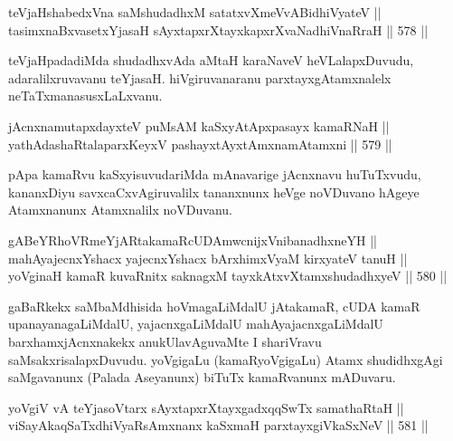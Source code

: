 
\begin{shl}
teVjaHshabedxVna saMshudadhxM satatxvXmeVvABidhiVyateV || \\
tasimxnaBxvasetxYjasaH sAyxtapxrXtayxkapxrXvaNadhiVnaRraH \hfill || 578 ||  
\end{shl}

\begin{artha}
teVjaHpadadiMda shudadhxvAda aMtaH karaNaveV heVLalapxDuvudu,
adaralilxruvavanu teYjasaH. hiVgiruvanaranu parxtayxgAtamxnalelx
neTaTxmanasusxLaLxvanu.
\end{artha}


\begin{shl}
jAcnxnamutapxdayxteV puMsAM kaSxyAtApxpasayx kamaRNaH || \\
yathA\s \s dashaRtalaparxKeyxV pashayxtAyxtAmxnamAtamxni \hfill || 579 ||  
\end{shl}

\begin{artha}
pApa kamaRvu kaSxyisuvudariMda mAnavarige jAcnxnavu huTuTxvudu,
kananxDiyu savxcaCxvAgiruvalilx tananxnunx heVge noVDuvano hAgeye
Atamxnanunx Atamxnalilx noVDuvanu.
\end{artha}


\begin{shl}
gABeYRhoVRmeYjARtakamaRcUDAmwcnijxVnibanadhxneYH || \\
mahAyajecnxYshacx yajecnxYshacx bArxhimxVyaM kirxyateV tanuH || \\
yoVginaH kamaR kuvaRnitx saknagxM tayxkAtxvX\s \s tamxshudadhxyeV \hfill || 580 ||  
\end{shl}

\begin{artha}
gaBaRkekx saMbaMdhisida hoVmagaLiMdalU jAtakamaR, cUDA kamaR
upanayanagaLiMdalU, yajacnxgaLiMdalU mahAyajacnx\-\break gaLiMdalU
barxhamxjAcnxnakekx anukUlavAguvaMte I shariVravu\break
saMsakxrisalapxDuvudu. yoVgigaLu (kamaRyoVgigaLu) Atamx shudidhxgAgi
saMgavanunx (Palada Aseyanunx) biTuTx kamaRvanunx mADuvaru.
\end{artha}


\begin{shl}
yoVgiV vA teYjasoV\s tarx sAyxtapxrXtayxgadxqqSwTx samathaRtaH || \\
viSayAkaqSaTxdhiVyaRsAmxnanx kaSxmaH parxtayxgiVkaSxNeV \hfill || 581 ||  
\end{shl}

